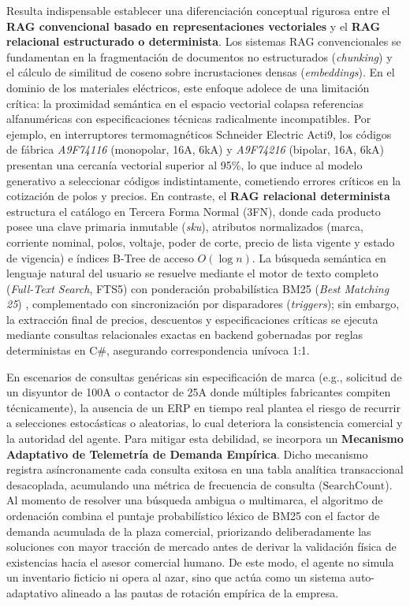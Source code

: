 Resulta indispensable establecer una diferenciación conceptual rigurosa entre el \textbf{RAG convencional basado en representaciones vectoriales} y el \textbf{RAG relacional estructurado o determinista}. Los sistemas RAG convencionales se fundamentan en la fragmentación de documentos no estructurados (\textit{chunking}) y el cálculo de similitud de coseno sobre incrustaciones densas (\textit{embeddings}). En el dominio de los materiales eléctricos, este enfoque adolece de una limitación crítica: la proximidad semántica en el espacio vectorial colapsa referencias alfanuméricas con especificaciones técnicas radicalmente incompatibles. Por ejemplo, en interruptores termomagnéticos Schneider Electric Acti9, los códigos de fábrica \textit{A9F74116} (monopolar, 16A, 6kA) y \textit{A9F74216} (bipolar, 16A, 6kA) presentan una cercanía vectorial superior al 95\%, lo que induce al modelo generativo a seleccionar códigos indistintamente, cometiendo errores críticos en la cotización de polos y precios. En contraste, el \textbf{RAG relacional determinista} estructura el catálogo en Tercera Forma Normal (3FN), donde cada producto posee una clave primaria inmutable (\textit{sku}), atributos normalizados (marca, corriente nominal, polos, voltaje, poder de corte, precio de lista vigente y estado de vigencia) e índices B-Tree de acceso $O(\log n)$. La búsqueda semántica en lenguaje natural del usuario se resuelve mediante el motor de texto completo (\textit{Full-Text Search}, FTS5) con ponderación probabilística BM25 (\textit{Best Matching 25}) \parencite{robertson2009probabilistic}, complementado con sincronización por disparadores (\textit{triggers}); sin embargo, la extracción final de precios, descuentos y especificaciones críticas se ejecuta mediante consultas relacionales exactas en backend gobernadas por reglas deterministas en C\#, asegurando correspondencia unívoca 1:1.

En escenarios de consultas genéricas sin especificación de marca (e.g., solicitud de un disyuntor de 100A o contactor de 25A donde múltiples fabricantes compiten técnicamente), la ausencia de un ERP en tiempo real plantea el riesgo de recurrir a selecciones estocásticas o aleatorias, lo cual deteriora la consistencia comercial y la autoridad del agente. Para mitigar esta debilidad, se incorpora un \textbf{Mecanismo Adaptativo de Telemetría de Demanda Empírica}. Dicho mecanismo registra asíncronamente cada consulta exitosa en una tabla analítica transaccional desacoplada, acumulando una métrica de frecuencia de consulta ($\text{SearchCount}$). Al momento de resolver una búsqueda ambigua o multimarca, el algoritmo de ordenación combina el puntaje probabilístico léxico de BM25 con el factor de demanda acumulada de la plaza comercial, priorizando deliberadamente las soluciones con mayor tracción de mercado antes de derivar la validación física de existencias hacia el asesor comercial humano. De este modo, el agente no simula un inventario ficticio ni opera al azar, sino que actúa como un sistema auto-adaptativo alineado a las pautas de rotación empírica de la empresa.

